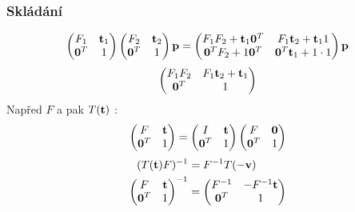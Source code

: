 \begin{frame}
    \frametitle{Skládání}
    \begin{equation*}
        \begin{pmatrix}
            F_1 & \mathbf{t}_1 \\
            \mathbf{0}^T & 1
        \end{pmatrix}
        \begin{pmatrix}
            F_2 & \mathbf{t}_2 \\
            \mathbf{0}^T & 1
        \end{pmatrix}\mathbf{p}
        = \begin{pmatrix}
            F_1F_2 + \mathbf{t}_1\mathbf{0}^T & F_1\mathbf{t}_2 + \mathbf{t}_11 \\
            \mathbf{0}^TF_2 + 1\mathbf{0}^T & \mathbf{0}^T\mathbf{t}_1 + 1\cdot1
        \end{pmatrix}\mathbf{p}
    \end{equation*}
    \pause
    \begin{equation*}
        \begin{pmatrix}
            F_1F_2 & F_1\mathbf{t}_2 + \mathbf{t}_1 \\
            \mathbf{0}^T & 1
        \end{pmatrix}
    \end{equation*}
    \pause\vfill
    Napřed $F$ a pak $T(\mathbf{t})$ :
    \begin{equation*}
        \begin{pmatrix}
            F & \mathbf{t} \\
            \mathbf{0}^T & 1
        \end{pmatrix}
        =\begin{pmatrix}
            I & \mathbf{t} \\
            \mathbf{0}^T & 1
        \end{pmatrix}
        \begin{pmatrix}
            F & \mathbf{0} \\
            \mathbf{0}^T & 1
        \end{pmatrix}
    \end{equation*}
    \pause\vfill
    \begin{align*}
        (T(\mathbf{t})F)^{-1} &= F^{-1}T(-\mathbf{v}) \\
        \begin{pmatrix}
            F & \mathbf{t} \\
            \mathbf{0}^T & 1
        \end{pmatrix}^{-1}
        &= \begin{pmatrix}
            F^{-1} & -F^{-1}\mathbf{t} \\
            \mathbf{0}^T & 1
        \end{pmatrix}
    \end{align*}
\end{frame}

